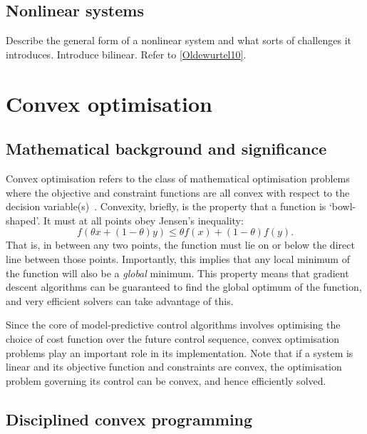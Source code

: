 \subsection{Nonlinear systems}


Describe the general form of a nonlinear system and what sorts of challenges it introduces.
Introduce bilinear.
Refer to \ref{Oldewurtel10}.

\section{Convex optimisation}

\subsection{Mathematical background and significance}

Convex optimisation refers to the class of mathematical optimisation problems where the objective and constraint functions are all convex with respect to the decision variable(s)~\cite{Boyd04}.
Convexity, briefly, is the property that a function is `bowl-shaped'.
It must at all points obey Jensen's inequality:
\begin{equation}
   f(\theta x + (1-\theta)y) \le \theta f(x) + (1-\theta) f(y).
\end{equation}
That is, in between any two points, the function must lie on or below the direct line between those points.
Importantly, this implies that any local minimum of the function will also be a \emph{global} minimum.
This property means that gradient descent algorithms can be guaranteed to find the global optimum of the function, and very efficient solvers can take advantage of this.

Since the core of model-predictive control algorithms involves optimising the choice of cost function over the future control sequence, convex optimisation problems play an important role in its implementation.
Note that if a system is linear and its objective function and constraints are convex, the optimisation problem governing its control can be convex, and hence efficiently solved.

\subsection{Disciplined convex programming}

